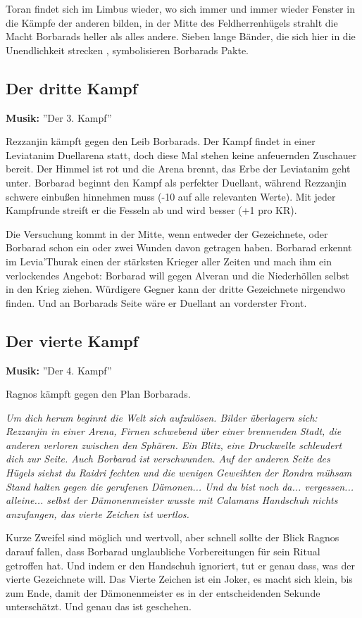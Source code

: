 Toran findet sich im Limbus wieder, wo sich immer und immer wieder Fenster in die Kämpfe der anderen bilden, in der Mitte des Feldherrenhügels strahlt die Macht Borbarads heller als alles andere. Sieben lange Bänder, die sich hier in die Unendlichkeit strecken , symbolisieren Borbarads Pakte.

\subsection{Der dritte Kampf}
\textbf{Musik:} ''Der 3. Kampf''

Rezzanjin kämpft gegen den Leib Borbarads. Der Kampf findet in einer Leviatanim Duellarena statt, doch diese Mal stehen keine anfeuernden Zuschauer bereit. Der Himmel ist rot und die Arena brennt, das Erbe der Leviatanim geht unter. Borbarad beginnt den Kampf als perfekter Duellant, während Rezzanjin schwere einbußen hinnehmen muss (-10 auf alle relevanten Werte). Mit jeder Kampfrunde streift er die Fesseln ab und wird besser (+1 pro KR).

Die Versuchung kommt in der Mitte, wenn entweder der Gezeichnete, oder Borbarad schon ein oder zwei Wunden davon getragen haben. Borbarad erkennt im Levia'Thurak einen der stärksten Krieger aller Zeiten und mach ihm ein verlockendes Angebot: Borbarad will gegen Alveran und die Niederhöllen selbst in den Krieg ziehen. Würdigere Gegner kann der dritte Gezeichnete nirgendwo finden. Und an Borbarads Seite wäre er Duellant an vorderster Front.

\subsection{Der vierte Kampf}
\textbf{Musik:} ''Der 4. Kampf''

Ragnos kämpft gegen den Plan Borbarads.

\emph{Um dich herum beginnt die Welt sich aufzulösen. Bilder überlagern sich: Rezzanjin in einer Arena, Firnen schwebend über einer brennenden Stadt, die anderen verloren zwischen den Sphären. Ein Blitz, eine Druckwelle schleudert dich zur Seite. Auch Borbarad ist verschwunden. Auf der anderen Seite des Hügels siehst du Raidri fechten und die wenigen Geweihten der Rondra mühsam Stand halten gegen die gerufenen Dämonen... Und du bist noch da... vergessen... alleine... selbst der Dämonenmeister wusste mit Calamans Handschuh nichts anzufangen, das vierte Zeichen ist wertlos.}

Kurze Zweifel sind möglich und wertvoll, aber schnell sollte der Blick Ragnos darauf fallen, dass Borbarad unglaubliche Vorbereitungen für sein Ritual getroffen hat. Und indem er den Handschuh ignoriert, tut er genau dass, was der vierte Gezeichnete will. Das Vierte Zeichen ist ein Joker, es macht sich klein, bis zum Ende, damit der Dämonenmeister es in der entscheidenden Sekunde unterschätzt. Und genau das ist geschehen.

